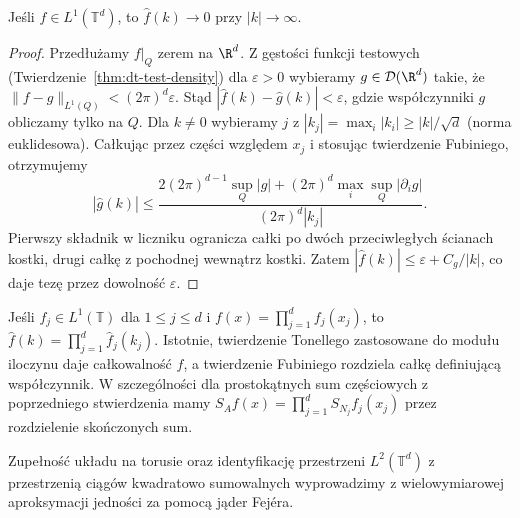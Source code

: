 \begin{stwierdzenie}
\label{prop:dt-series-torus-rl}
Jeśli $f\in L^1(\mathbb T^d)$, to
$\widehat f(k)\to0$ przy $|k|\to\infty$.
\end{stwierdzenie}
\begin{proof}
Przedłużamy $f|_Q$ zerem na $\R^d$.
Z gęstości funkcji testowych
(Twierdzenie~\ref{thm:dt-test-density})
dla $\varepsilon>0$ wybieramy $g\in\mathcal D(\R^d)$
takie, że $\|f-g\|_{L^1(Q)}<(2\pi)^d\varepsilon$.
Stąd $|\widehat f(k)-\widehat g(k)|<\varepsilon$,
gdzie współczynniki $g$ obliczamy tylko na $Q$.
Dla $k\ne0$ wybieramy $j$ z
$|k_j|=\max_i|k_i|\ge |k|/\sqrt d$ (norma euklidesowa).
Całkując przez części względem $x_j$ i stosując
twierdzenie Fubiniego, otrzymujemy
\[
 |\widehat g(k)|\le
 \frac{2(2\pi)^{d-1}\sup_Q|g|
 +(2\pi)^d\max_i\sup_Q|\partial_i g|}
 {(2\pi)^d|k_j|}.
\]
Pierwszy składnik w liczniku ogranicza całki
po dwóch przeciwległych ścianach kostki,
drugi całkę z pochodnej wewnątrz kostki.
Zatem $|\widehat f(k)|\le\varepsilon+C_g/|k|$,
co daje tezę przez dowolność $\varepsilon$.
\end{proof}

\begin{przyklad}
\label{ex:dt-series-torus-product}
Jeśli $f_j\in L^1(\mathbb T)$ dla $1\le j\le d$
i $f(x)=\prod_{j=1}^df_j(x_j)$, to
$\widehat f(k)=\prod_{j=1}^d\widehat f_j(k_j)$.
Istotnie, twierdzenie Tonellego zastosowane do
modułu iloczynu daje całkowalność $f$, a twierdzenie
Fubiniego rozdziela całkę definiującą współczynnik.
W szczególności dla prostokątnych sum częściowych
z poprzedniego stwierdzenia mamy
$S_Af(x)=\prod_{j=1}^d S_{N_j}f_j(x_j)$
przez rozdzielenie skończonych sum.
\end{przyklad}

Zupełność układu na torusie oraz identyfikację
przestrzeni $L^2(\mathbb T^d)$ z przestrzenią
ciągów kwadratowo sumowalnych wyprowadzimy
z wielowymiarowej aproksymacji jedności
za pomocą jąder Fejéra.
